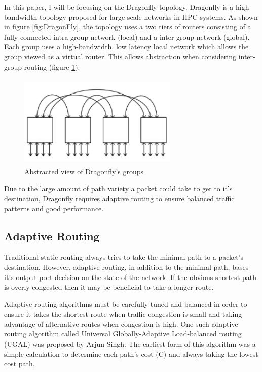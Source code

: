 \documentclass[conference,12pt]{IEEEtran}
\begin{document}
In this paper, I will be focusing on the Dragonfly topology.\cite{Dragonfly} Dragonfly is a  high-bandwidth topology proposed for large-scale networks in HPC systems. As shown in figure \ref{fig:DragonFly}, the topology uses a two tiers of routers consisting of a fully connected intra-group network (local) and a inter-group network (global). Each group uses a high-bandwidth, low latency local network which allows the group viewed as a virtual router. This allows abstraction when considering inter-group routing (figure \ref{fig:HyperX}). 

\begin{figure}[ht]
  \begin{center}
    \includegraphics[width=3in,height=1.75in]{figures/HyperX.png}
  \end{center}
   \vspace{-0.25in}
 \caption{Abstracted view of Dragonfly's groups\cite{HyperX}}
 \label{fig:HyperX}
\end{figure}

Due to the large amount of path variety a packet could take to get to it's destination, Dragonfly requires adaptive routing to ensure balanced traffic patterns and good performance. 

\subsection{Adaptive Routing}
Traditional static routing always tries to take the minimal path to a packet's destination.  However, adaptive routing, in addition to the minimal path, bases it's output port decision on the state of the network. If the obvious shortest path is overly congested then it may be beneficial to take a longer route. 

Adaptive routing algorithms must be carefully tuned and balanced in order to ensure it takes the shortest route when traffic congestion is small and taking advantage of alternative routes when congestion is high. One such adaptive routing algorithm called Universal Globally-Adaptive Load-balanced routing (UGAL) was proposed by Arjun Singh.\cite{s05} The earliest form of this algorithm was a simple calculation to determine each path's cost (C) and always taking the lowest cost path. 
\end{document}
